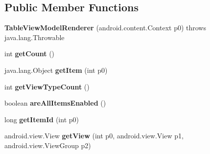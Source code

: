 \subsection*{Public Member Functions}
\begin{DoxyCompactItemize}
\item 
\mbox{\label{classmd5b60ffeb829f638581ab2bb9b1a7f4f3f_1_1TableViewModelRenderer_aad4e5ad3ec274ab13c8625a4e0a16e8f}} 
{\bfseries Table\+View\+Model\+Renderer} (android.\+content.\+Context p0)  throws java.\+lang.\+Throwable 	
\item 
\mbox{\label{classmd5b60ffeb829f638581ab2bb9b1a7f4f3f_1_1TableViewModelRenderer_a3ee9ec4f5e214d15ca53d52792300f53}} 
int {\bfseries get\+Count} ()
\item 
\mbox{\label{classmd5b60ffeb829f638581ab2bb9b1a7f4f3f_1_1TableViewModelRenderer_a29fccc826a353ce09af883f666114b60}} 
java.\+lang.\+Object {\bfseries get\+Item} (int p0)
\item 
\mbox{\label{classmd5b60ffeb829f638581ab2bb9b1a7f4f3f_1_1TableViewModelRenderer_abdc0339817da42f6cb84ae51e23dfdcc}} 
int {\bfseries get\+View\+Type\+Count} ()
\item 
\mbox{\label{classmd5b60ffeb829f638581ab2bb9b1a7f4f3f_1_1TableViewModelRenderer_acd02c865f8a377a11fa054fa8269b8bc}} 
boolean {\bfseries are\+All\+Items\+Enabled} ()
\item 
\mbox{\label{classmd5b60ffeb829f638581ab2bb9b1a7f4f3f_1_1TableViewModelRenderer_ab9aaff4a338f4d59482b230ef3a05bcb}} 
long {\bfseries get\+Item\+Id} (int p0)
\item 
\mbox{\label{classmd5b60ffeb829f638581ab2bb9b1a7f4f3f_1_1TableViewModelRenderer_a57aa1ff548af7c33edb21978ce2bc22c}} 
android.\+view.\+View {\bfseries get\+View} (int p0, android.\+view.\+View p1, android.\+view.\+View\+Group p2)

\end{DoxyCompactItemize}
